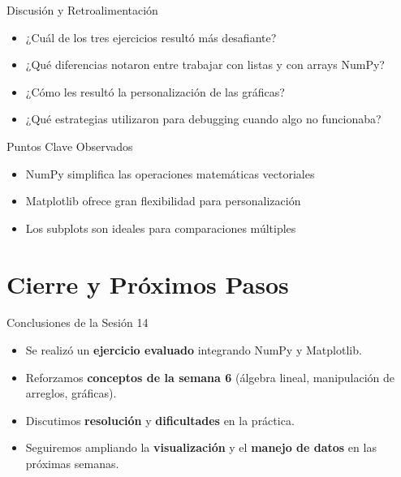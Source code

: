 \documentclass[10pt]{beamer}
\begin{document}
\begin{frame}{Discusión y Retroalimentación}
  \begin{itemize}
    \item ¿Cuál de los tres ejercicios resultó más desafiante?
    \item ¿Qué diferencias notaron entre trabajar con listas y con arrays NumPy?
    \item ¿Cómo les resultó la personalización de las gráficas?
    \item ¿Qué estrategias utilizaron para debugging cuando algo no funcionaba?
  \end{itemize}
  
  \begin{alertblock}{Puntos Clave Observados}
    \begin{itemize}
      \item NumPy simplifica las operaciones matemáticas vectoriales
      \item Matplotlib ofrece gran flexibilidad para personalización
      \item Los subplots son ideales para comparaciones múltiples
    \end{itemize}
  \end{alertblock}
\end{frame}




\section{Cierre y Próximos Pasos}

\begin{frame}{Conclusiones de la Sesión 14}
  \begin{itemize}
    \item Se realizó un \textbf{ejercicio evaluado} integrando NumPy y Matplotlib.
    \item Reforzamos \textbf{conceptos de la semana 6} (álgebra lineal, manipulación de arreglos, gráficas).
    \item Discutimos \textbf{resolución} y \textbf{dificultades} en la práctica.
    \item Seguiremos ampliando la \textbf{visualización} y el \textbf{manejo de datos} en las próximas semanas.
  \end{itemize}
\end{frame}
\end{document}
